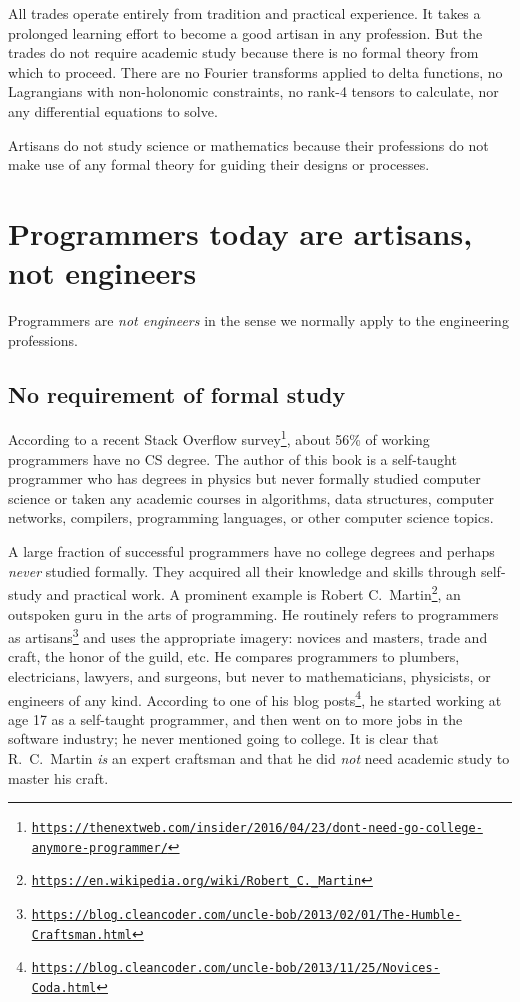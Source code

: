 All trades operate entirely from tradition and practical experience.
It takes a prolonged learning effort to become a good artisan in any
profession. But the trades do not require academic study because there
is no formal theory from which to proceed. There are no Fourier transforms
applied to delta functions, no Lagrangians with non-holonomic constraints,
no rank-4 tensors to calculate, nor any differential equations to
solve.

Artisans do not study science or mathematics because their professions
do not make use of any formal theory for guiding their designs or
processes.

\section{Programmers today are artisans, not engineers }

Programmers are \emph{not engineers} in the sense we normally apply
to the engineering professions.

\subsection{No requirement of formal study }

According to a recent Stack Overflow survey\footnote{\texttt{\href{https://thenextweb.com/insider/2016/04/23/dont-need-go-college-anymore-programmer/}{https://thenextweb.com/insider/2016/04/23/dont-need-go-college-anymore-programmer/}}},
about 56\% of working programmers have no CS degree. The author of
this book is a self-taught programmer who has degrees in physics but
never formally studied computer science or taken any academic courses
in algorithms, data structures, computer networks, compilers, programming
languages, or other computer science topics. 

A large fraction of successful programmers have no college degrees
and perhaps \emph{never} studied formally. They acquired all their
knowledge and skills through self-study and practical work. A prominent
example is Robert C.~Martin\footnote{\texttt{\href{https://en.wikipedia.org/wiki/Robert_C._Martin}{https://en.wikipedia.org/wiki/Robert\_C.\_Martin}}},
an outspoken guru in the arts of programming. He routinely refers
to programmers as artisans\footnote{\texttt{\href{https://blog.cleancoder.com/uncle-bob/2013/02/01/The-Humble-Craftsman.html}{https://blog.cleancoder.com/uncle-bob/2013/02/01/The-Humble-Craftsman.html}}}
and uses the appropriate imagery: novices and masters, trade and craft,
the honor of the guild, etc. He compares programmers to plumbers,
electricians, lawyers, and surgeons, but never to mathematicians,
physicists, or engineers of any kind. According to one of his blog
posts\footnote{\texttt{\href{https://blog.cleancoder.com/uncle-bob/2013/11/25/Novices-Coda.html}{https://blog.cleancoder.com/uncle-bob/2013/11/25/Novices-Coda.html}}},
he started working at age 17 as a self-taught programmer, and then
went on to more jobs in the software industry; he never mentioned
going to college. It is clear that R.~C.~Martin \emph{is} an expert
craftsman and that he did \emph{not} need academic study to master
his craft.

